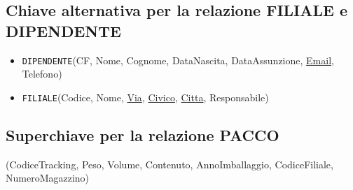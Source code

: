 \subsection{Chiave alternativa per la relazione FILIALE e DIPENDENTE}
\begin{itemize}
    \item \texttt{DIPENDENTE}(CF, Nome, Cognome, DataNascita, DataAssunzione, \underline{Email}, Telefono)
    \item \texttt{FILIALE}(Codice, Nome, \underline{Via}, \underline{Civico}, \underline{Citta}, Responsabile)
\end{itemize}

\subsection{Superchiave per la relazione PACCO}
(CodiceTracking, Peso, Volume, Contenuto, AnnoImballaggio, CodiceFiliale, NumeroMagazzino)
